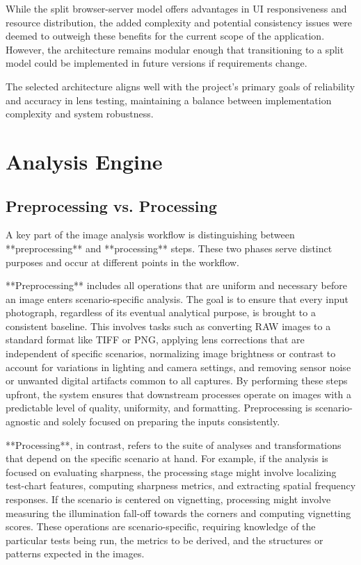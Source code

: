 While the split browser-server model offers advantages in UI responsiveness and resource distribution, the added complexity and potential consistency issues were deemed to outweigh these benefits for the current scope of the application. However, the architecture remains modular enough that transitioning to a split model could be implemented in future versions if requirements change.

The selected architecture aligns well with the project's primary goals of reliability and accuracy in lens testing, maintaining a balance between implementation complexity and system robustness.

\section{Analysis Engine}

\subsection{Preprocessing vs. Processing}

A key part of the image analysis workflow is distinguishing between **preprocessing** and **processing** steps. These two phases serve distinct purposes and occur at different points in the workflow.

**Preprocessing** includes all operations that are uniform and necessary before an image enters scenario-specific analysis. The goal is to ensure that every input photograph, regardless of its eventual analytical purpose, is brought to a consistent baseline. This involves tasks such as converting RAW images to a standard format like TIFF or PNG, applying lens corrections that are independent of specific scenarios, normalizing image brightness or contrast to account for variations in lighting and camera settings, and removing sensor noise or unwanted digital artifacts common to all captures. By performing these steps upfront, the system ensures that downstream processes operate on images with a predictable level of quality, uniformity, and formatting. Preprocessing is scenario-agnostic and solely focused on preparing the inputs consistently.

**Processing**, in contrast, refers to the suite of analyses and transformations that depend on the specific scenario at hand. For example, if the analysis is focused on evaluating sharpness, the processing stage might involve localizing test-chart features, computing sharpness metrics, and extracting spatial frequency responses. If the scenario is centered on vignetting, processing might involve measuring the illumination fall-off towards the corners and computing vignetting scores. These operations are scenario-specific, requiring knowledge of the particular tests being run, the metrics to be derived, and the structures or patterns expected in the images.

